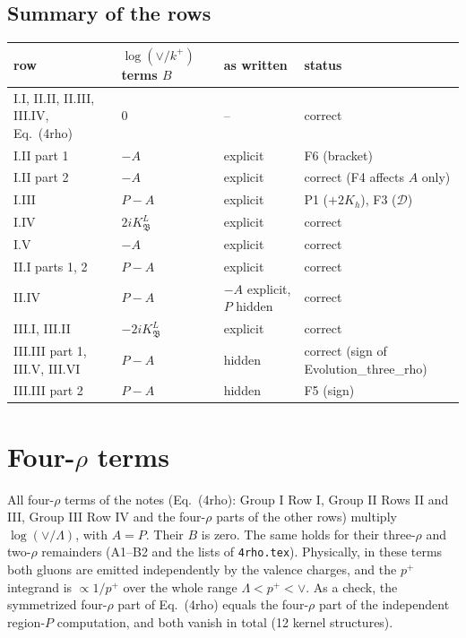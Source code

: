\documentclass[10pt]{article}
\numberwithin{equation}{section}
\newcommand{\pp}{p^+}
\begin{document}
\subsection{Summary of the rows}
\begin{center}\small
\begin{tabular}{@{}l l l l@{}}
row & $\log(\vee/k^+)$ terms $B$ & as written & status\\ \hline
I.I, II.II, II.III, III.IV, Eq.~(4rho) & 0 & -- & correct\\
I.II part 1 & $-A$ & explicit & F6 (bracket)\\
I.II part 2 & $-A$ & explicit & correct (F4 affects $A$ only)\\
I.III & $P-A$ & explicit & P1 ($+2K_h$), F3 ($\mathcal D$)\\
I.IV & $2iK^L_{\mathfrak B}$ & explicit & correct\\
I.V & $-A$ & explicit & correct\\
II.I parts 1, 2 & $P-A$ & explicit & correct\\
II.IV & $P-A$ & $-A$ explicit, $P$ hidden & correct\\
III.I, III.II & $-2iK^L_{\mathfrak B}$ & explicit & correct\\
III.III part 1, III.V, III.VI & $P-A$ & hidden & correct (sign of Evolution\_three\_rho)\\
III.III part 2 & $P-A$ & hidden & F5 (sign)\\
\end{tabular}
\end{center}


\section{Four-\texorpdfstring{$\rho$}{rho} terms}\label{sec:four}
All four-$\rho$ terms of the notes (Eq.~(4rho): Group I Row I, Group II Rows II and III, Group III Row IV and the four-$\rho$ parts of the other rows) multiply $\log(\vee/\Lambda)$, with $A=P$. Their $B$ is zero. The same holds for their three-$\rho$ and two-$\rho$ remainders (A1--B2 and the lists of \texttt{4rho.tex}). Physically, in these terms both gluons are emitted independently by the valence charges, and the $\pp$ integrand is $\propto1/\pp$ over the whole range $\Lambda<\pp<\vee$. As a check, the symmetrized four-$\rho$ part of Eq.~(4rho) equals the four-$\rho$ part of the independent region-$P$ computation, and both vanish in total (12 kernel structures).
\end{document}
